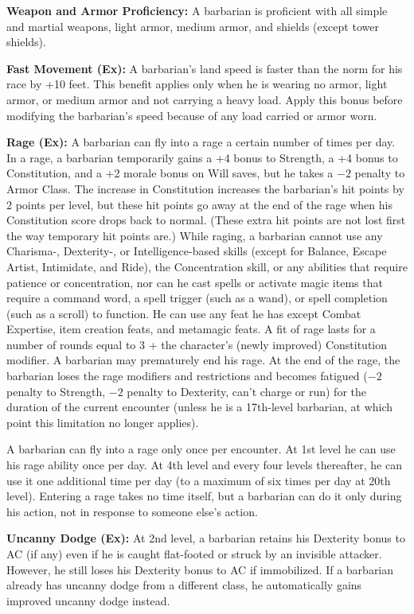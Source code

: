 \documentclass[10pt,a4paper,twocolumn]{d20}
\begin{document}
{\textbf{Weapon and Armor Proficiency:} A barbarian is proficient with all simple and martial weapons, light armor, medium armor, and shields (except tower shields).

\textbf{Fast Movement (Ex):} A barbarian’s land speed is faster than the norm for his race by +10 feet. This benefit applies only when he is wearing no armor, light armor, or medium armor and not carrying a heavy load. Apply this bonus before modifying the barbarian’s speed because of any load carried or armor worn.

\textbf{Rage (Ex):} A barbarian can fly into a rage a certain number of times per day. In a rage, a barbarian temporarily gains a +4 bonus to Strength, a +4 bonus to Constitution, and a +2 morale bonus on Will saves, but he takes a $-2$ penalty to Armor Class. The increase in Constitution increases the barbarian’s hit points by 2 points per level, but these hit points go away at the end of the rage when his Constitution  score drops back to normal. (These extra hit points are not lost first the way temporary hit points are.) While raging, a barbarian cannot use any Charisma-, Dexterity-, or Intelligence-based skills (except for Balance, Escape Artist, Intimidate, and Ride), the Concentration skill, or any abilities that require patience or concentration, nor can he cast spells or activate magic items that require a command word, a spell trigger (such as a wand), or spell completion (such as a scroll) to function. He can use any feat he has except Combat Expertise, item creation feats, and metamagic feats. A fit of rage lasts for a number of rounds equal to 3 + the character’s (newly improved) Constitution modifier. A barbarian may prematurely end his rage. At the end of the rage, the barbarian loses the rage modifiers and restrictions and becomes fatigued ($-2$ penalty to Strength, $-2$ penalty to Dexterity, can’t charge or run) for the duration of the current encounter (unless he is a 17th-level barbarian, at which point this limitation no longer applies).

A barbarian can fly into a rage only once per encounter. At 1st level he can use his rage ability once per day. At 4th level and every four levels thereafter, he can use it one additional time per day (to a maximum of six times per day at 20th level). Entering a rage takes no time itself, but a barbarian can do it only during his action, not in response to someone else’s action. 

\textbf{Uncanny Dodge (Ex):} At 2nd level, a barbarian retains his Dexterity bonus to AC (if any) even if he is caught flat-footed or struck by an invisible attacker. However, he still loses his Dexterity bonus to AC if immobilized. If a barbarian already has uncanny dodge from a different class, he automatically gains improved uncanny dodge instead.

}
\end{document}
